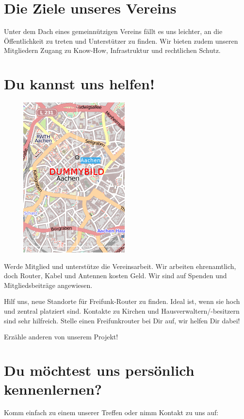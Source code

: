 \documentclass[10pt]{scrartcl}
\begin{document}
\section{\normalsize Die Ziele unseres Vereins}
Unter dem Dach eines gemeinnützigen Vereins fällt es uns leichter, an die Öffentlichkeit zu treten und Unterstützer zu finden. Wir bieten zudem unseren Mitgliedern Zugang zu Know-How, Infrastruktur und rechtlichen Schutz.

\section{\normalsize Du kannst uns helfen!}
\begin{figure}
\includegraphics[scale=0.5]{Karte}
\end{figure}
Werde Mitglied und unterstütze die Vereinsarbeit. Wir arbeiten ehrenamtlich, doch Router, Kabel und Antennen kosten Geld. Wir sind auf Spenden und Mitgliedsbeiträge angewiesen.

Hilf uns, neue Standorte für Freifunk-Router zu finden. Ideal ist, wenn sie hoch und zentral platziert sind. Kontakte zu Kirchen und Hausverwaltern/-besitzern sind sehr hilfreich. Stelle einen Freifunkrouter bei Dir auf, wir helfen Dir dabei!

Erzähle anderen von unserem Projekt!

\section{\normalsize Du möchtest uns persönlich kennenlernen?}
Komm einfach zu einem unserer Treffen oder nimm Kontakt zu uns auf:
\end{document}

